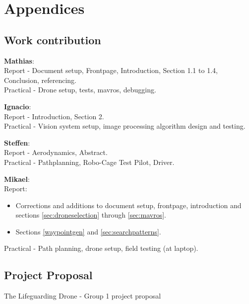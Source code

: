 \part*{Appendices}
\appendix
\chapter{Work contribution}
\label{app:work}
\textbf{Mathias}:\\
Report - Document setup, Frontpage,  Introduction, Section  1.1 to 1.4, Conclusion, referencing.\\
Practical - Drone setup, tests, mavros, debugging.

\textbf{Ignacio}:\\
Report - Introduction, Section  2.\\
Practical - Vision system setup, image processing algorithm design and testing.

\textbf{Steffen}:\\
Report - Aerodynamics, Abstract.\\
Practical - Pathplanning, 
Robo-Cage Test Pilot, Driver.

\textbf{Mikael}:\\
Report:
\begin{itemize}
\item Corrections and additions to document setup, frontpage, introduction and sections \ref{sec:droneselection} through \ref{sec:mavros}.
\item Sections \ref{waypointgen} and \ref{sec:searchpatterns}.
\end{itemize}
Practical - Path planning, drone setup, field testing (at laptop).

\newpage

\chapter{Project Proposal}
\label{app:projectproposal}
The Lifeguarding Drone - Group 1 project proposal\\
